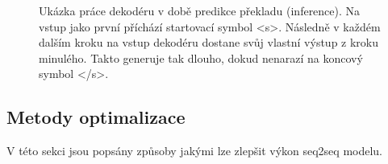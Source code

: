 \begin{figure}[H]
    \begin{center}
    \end{center}
	\caption{Ukázka práce dekodéru v době predikce překladu (inference). Na vstup jako první příchází startovací symbol <s>. Následně v každém dalším kroku na vstup dekodéru dostane svůj vlastní výstup z kroku minulého. Takto generuje tak dlouho, dokud nenarazí na koncový symbol </s>.}
	\label{img:inference}
\end{figure}

\subsection{Metody optimalizace} \label{subsection:optimization} V této sekci jsou popsány způsoby jakými lze zlepšit výkon seq2seq modelu.

